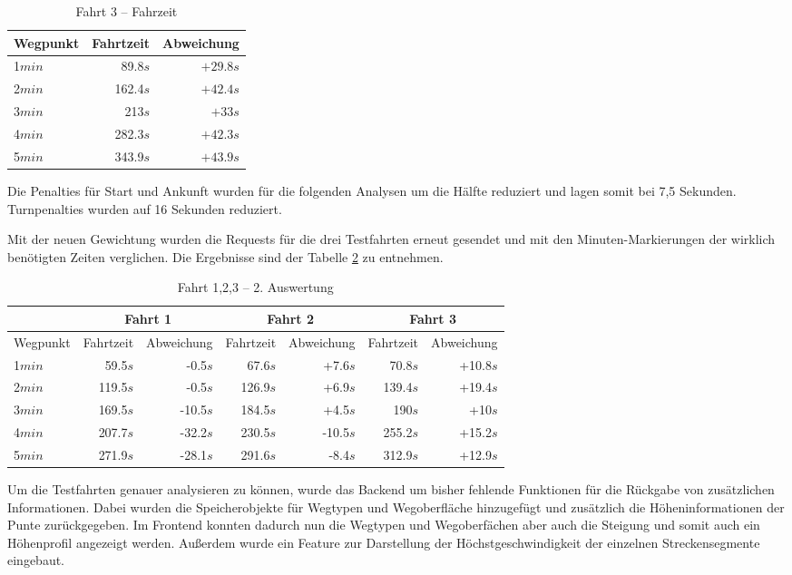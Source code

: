 \begin{table}[]
\centering
\caption{Fahrt 3 -- Fahrzeit}
\label{tab:drive3}
\begin{tabular}{|l|r|r|}
\hline
Wegpunkt & Fahrtzeit & Abweichung \\ \hline 
1$min$ &  89.8$s$ & $+29.8s$ \\
2$min$ &  162.4$s$ & $+42.4s$ \\
3$min$ &  213$s$ & $+33s$ \\
4$min$ &  282.3$s$ & $+42.3s$ \\
5$min$ &  343.9$s$ & $+43.9s$ \\
\hline
\end{tabular}
\end{table}

Die Penalties für Start und Ankunft wurden für die folgenden Analysen um die Hälfte reduziert und lagen somit bei 7,5 Sekunden.
Turnpenalties wurden auf 16 Sekunden reduziert.

Mit der neuen Gewichtung wurden die Requests für die drei Testfahrten erneut gesendet und mit den Minuten-Markierungen der wirklich benötigten Zeiten verglichen.
Die Ergebnisse sind der Tabelle \ref{tab:all} zu entnehmen.

\begin{table}[]
\centering
\caption{Fahrt 1,2,3 -- 2. Auswertung}
\label{tab:all}
\begin{tabular}{|l|r|r|r|r|r|r|}
\hhline{~|-|-|-|-|-|-}
\multicolumn{1}{l|}{} & \multicolumn{2}{c|}{Fahrt 1} & \multicolumn{2}{c|}{Fahrt 2} & \multicolumn{2}{c|}{Fahrt 3} \\ \hline
Wegpunkt              & Fahrtzeit   & Abweichung     & Fahrtzeit   & Abweichung     & Fahrtzeit  & Abweichung      \\ \hline 
1$min$                & 59.5$s$     & -0.5$s$        & 67.6$s$     & +7.6$s$        & 70.8$s$    & +10.8$s$        \\
2$min$                & 119.5$s$    & -0.5$s$        & 126.9$s$    & +6.9$s$        & 139.4$s$   & +19.4$s$        \\
3$min$                & 169.5$s$    & -10.5$s$       & 184.5$s$    & +4.5$s$        & 190$s$     & +10$s$          \\
4$min$                & 207.7$s$    & -32.2$s$       & 230.5$s$    & -10.5$s$       & 255.2$s$   & +15.2$s$        \\
5$min$                & 271.9$s$    & -28.1$s$       & 291.6$s$    & -8.4$s$        & 312.9$s$   & +12.9$s$        \\
\hline
\end{tabular}
\end{table}


Um die Testfahrten genauer analysieren zu können, wurde das Backend um bisher fehlende Funktionen für die Rückgabe von zusätzlichen Informationen.
Dabei wurden die Speicherobjekte für Wegtypen und Wegoberfläche hinzugefügt und zusätzlich die Höheninformationen der Punte zurückgegeben.
Im Frontend konnten dadurch nun die Wegtypen und Wegoberfächen aber auch die Steigung und somit auch ein Höhenprofil angezeigt werden.
Außerdem wurde ein Feature zur Darstellung der Höchstgeschwindigkeit der einzelnen Streckensegmente eingebaut.